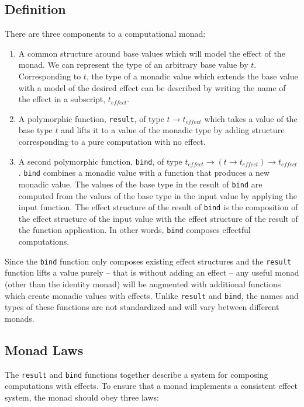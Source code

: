 \documentclass[natbib,10pt]{sigplanconf}
\begin{document}
\subsection{Definition}

There are three components to a computational monad:
\begin{enumerate}
\item
A common structure around base values which will model the
effect of the monad.  We can represent the type of an arbitrary
base value by $t$. Corresponding to $t$, the type of a monadic
value which extends the base value with a model of the desired
effect can be described by writing the name of the effect
in a subscript, $t_{effect}$.

\item
A polymorphic function, \texttt{result}, of type $t \rightarrow t_{effect}$
which takes a value of the base type $t$ and lifts it to a value of the
monadic type by adding structure corresponding to a pure computation
with no effect.

\item
A second polymorphic function, \texttt{bind}, of type
$t_{effect} \rightarrow (t \rightarrow t_{effect}) \rightarrow t_{effect}$.
\texttt{bind} combines a monadic value with a function that produces a new 
monadic value. The values of the base type in the result of \texttt{bind} 
are computed from the values of the base type in the input value by 
applying the input function.  The effect structure of the result of 
\texttt{bind} is the composition of the effect structure of the input value 
with the effect structure of the result of the function application. In other
words, \texttt{bind} composes effectful computations.
\end{enumerate}

Since the \texttt{bind} function only composes existing effect structures
and the \texttt{result} function lifts a value purely -- that is without
adding an effect -- any useful monad (other than the identity monad)
will be augmented with additional functions which create monadic
values with effects.  Unlike \texttt{result} and \texttt{bind}, the names
and types of these functions are not standardized and will vary
between different monads.

\subsection{Monad Laws}

The \texttt{result} and \texttt{bind} functions together describe a system
for composing computations with effects.  To ensure that a monad
implements a consistent effect system, the monad should obey three laws:
\end{document}
